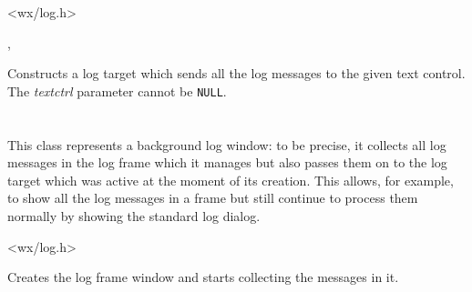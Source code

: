 


<wx/log.h>


,\\


\label{wxlogtextctrlctor}


Constructs a log target which sends all the log messages to the given text
control. The {\it textctrl} parameter cannot be {\tt NULL}.


\section{}\label{wxlogwindow}

This class represents a background log window: to be precise, it collects all
log messages in the log frame which it manages but also passes them on to the
log target which was active at the moment of its creation. This allows, for
example, to show all the log messages in a frame but still continue to process
them normally by showing the standard log dialog.




<wx/log.h>




\label{wxlogwindowctor}


Creates the log frame window and starts collecting the messages in it.

